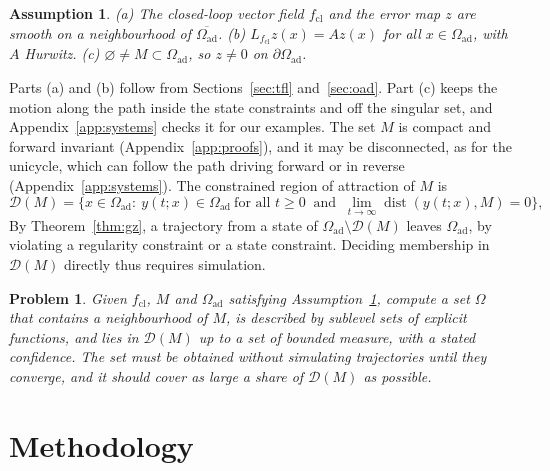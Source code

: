 \documentclass{l4dc2027}
\newcommand{\Oad}{\Omega_{\mathrm{ad}}}
\newcommand{\D}{\mathcal D}
\newcommand{\dist}{\operatorname{dist}}
\newtheorem{problem}{Problem}
\newtheorem{assumption}{Assumption}
\begin{document}
\vspace{-0.075in}

\begin{assumption}\label{ass:main}
(a) The closed-loop vector field $f_{\mathrm{cl}}$ and the error map $z$ are smooth on a neighbourhood of $\overline{\Oad}$. (b) $L_{f_{\mathrm{cl}}}z(x)=Az(x)$ for all $x\in\Oad$, with $A$ Hurwitz. (c) $\varnothing\ne M\subset\Oad$, so $z\ne0$ on $\partial\Oad$.
\end{assumption}

\vspace{-0.075in}

Parts (a) and (b) follow from Sections~\ref{sec:tfl} and~\ref{sec:oad}. Part (c) keeps the motion along the path inside the state constraints and off the singular set, and Appendix~\ref{app:systems} checks it for our examples. The set $M$ is compact and forward invariant (Appendix~\ref{app:proofs}), and it may be disconnected, as for the unicycle, which can follow the path driving forward or in reverse (Appendix~\ref{app:systems}). The constrained region of attraction of $M$ is
\begin{equation}\label{eq:D}
\D(M)=\bigl\{x\in\Oad:\ y(t;x)\in\Oad\ \text{for all }t\ge0\ \text{ and }\ \lim_{t\to\infty}\dist(y(t;x),M)=0\bigr\},
\end{equation}
By Theorem~\ref{thm:gz}, a trajectory from a state of $\Oad\setminus\D(M)$ leaves $\Oad$, by violating a regularity constraint or a state constraint. Deciding membership in $\D(M)$ directly thus requires simulation.

\vspace{-0.075in}

\begin{problem}\label{prob:main}
Given $f_{\mathrm{cl}}$, $M$ and $\Oad$ satisfying Assumption~\ref{ass:main}, compute a set $\Omega$ that contains a neighbourhood of $M$, is described by sublevel sets of explicit functions, and lies in $\D(M)$ up to a set of bounded measure, with a stated confidence. The set must be obtained without simulating trajectories until they converge, and it should cover as large a share of $\D(M)$ as possible.
\end{problem}


\vspace{-0.2in}

\section{Methodology}\label{sec:method}
\end{document}
